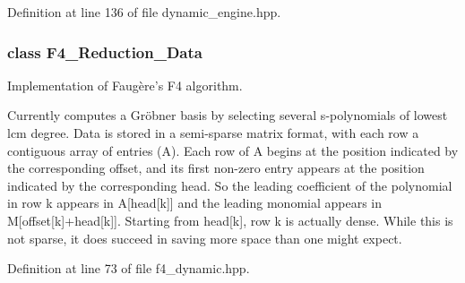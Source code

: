 Definition at line 136 of file dynamic\+\_\+engine.\+hpp.

\label{class_f4___reduction___data}
\subsubsection{class F4\+\_\+\+Reduction\+\_\+\+Data}
Implementation of Faug\`{e}re's F4 algorithm. 

Currently computes a Gr\"{o}bner basis by selecting several s-\/polynomials of lowest lcm degree. Data is stored in a semi-\/sparse matrix format, with each row a contiguous array of entries ({\ttfamily A}). Each row of {\ttfamily A} begins at the position indicated by the corresponding {\ttfamily offset}, and its first non-\/zero entry appears at the position indicated by the corresponding {\ttfamily head}. So the leading coefficient of the polynomial in row {\ttfamily k} appears in {\ttfamily A\mbox{[}head\mbox{[}k\mbox{]}\mbox{]}} and the leading monomial appears in {\ttfamily M\mbox{[}offset\mbox{[}k\mbox{]}+head\mbox{[}k\mbox{]}\mbox{]}}. Starting from {\ttfamily head\mbox{[}k\mbox{]}}, row {\ttfamily k} is actually dense. While this is not sparse, it does succeed in saving more space than one might expect. 

Definition at line 73 of file f4\+\_\+dynamic.\+hpp.

